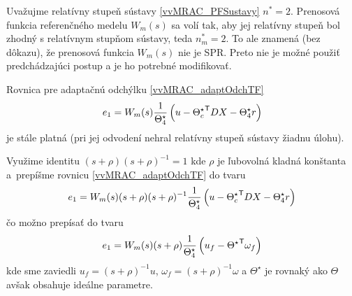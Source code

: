 ﻿\documentclass[a4paper, 10pt, ]{article}
\begin{document}
Uvažujme relatívny stupeň sústavy \eqref{vvMRAC_PFSustavy} $n^* = 2$. Prenosová funkcia referenčného medelu $W_m(s)$ sa volí tak, aby jej relatívny stupeň bol zhodný s relatívnym stupňom sústavy, teda $n_m^* = 2$. To ale znamená (bez dôkazu), že prenosová funkcia $W_m(s)$ nie je SPR. Preto nie je možné použiť predchádzajúci postup a je ho potrebné modifikovať.

Rovnica pre adaptačnú odchýlku \eqref{vvMRAC_adaptOdchTF}
\begin{equation} \label{vvMRAC_adaptOdchTFn2}
	e_1 = W_m(s)  \frac{1}{\Theta_4^\star} \left( u - {\Theta_c^\star}^{\mathsf{T}} D  X - \Theta_4^\star  r \right)
\end{equation}
je stále platná (pri jej odvodení nehral relatívny stupeň sústavy žiadnu úlohu).

Využime identitu $(s+\rho)(s+\rho)^{-1} = 1$ kde $\rho$ je ľubovolná kladná konštanta a~prepíšme rovnicu \eqref{vvMRAC_adaptOdchTF} do tvaru
\begin{equation}  \label{vvMRAC_adaptOdchI}
	e_1 = W_m(s) (s+\rho)(s+\rho)^{-1} \frac{1}{\Theta_4^\star} \left( u - {\Theta_c^\star}^{\mathsf{T}} D X - \Theta_4^\star  r \right)
\end{equation}
čo možno prepísať do tvaru
\begin{equation}  \label{vvMRAC_adaptOdchI_02}
	e_1 = W_m(s) (s+\rho) \frac{1}{\Theta_4^\star} \left( u_f - {\Theta^\star}^{\mathsf{T}} \omega_f \right)
\end{equation}
kde sme zaviedli $u_f = (s+\rho)^{-1} u$, $\omega_f = (s+\rho)^{-1} \omega$ a ${\Theta^\star}$ je rovnaký ako $\Theta$ avšak obsahuje ideálne parametre.
\end{document}
